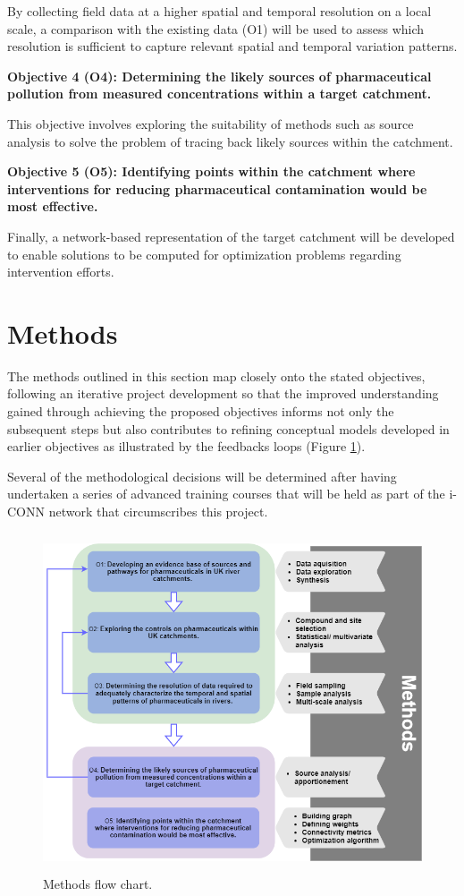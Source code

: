 \documentclass{article}
\begin{document}
By collecting field data at a higher spatial and temporal resolution on a local scale, a comparison with the existing data (O1) will be used to assess which resolution is sufficient to capture relevant spatial and temporal variation patterns.

\vspace{5mm}
\textbf{Objective 4 (O4): Determining the likely sources of pharmaceutical pollution from measured concentrations within a target catchment.}

This objective involves exploring the suitability of methods such as source analysis to solve the problem of tracing back likely sources within the catchment.

\vspace{5mm}
\textbf{Objective 5 (O5): Identifying points within the catchment where interventions for reducing pharmaceutical contamination would be most effective.}

Finally, a network-based representation of the target catchment will be developed to enable solutions to be  computed for optimization problems regarding intervention efforts.

\clearpage
\section{Methods}
The methods outlined in this section map closely onto the stated objectives, following an iterative project development so that the improved understanding gained through achieving the proposed objectives informs not only the subsequent steps but also contributes to refining conceptual models developed in earlier objectives as illustrated by the feedbacks loops (Figure \ref{fig_workflow}). 

Several of the methodological decisions will be determined after having undertaken a series of advanced training courses that will be held as part of the i-CONN network \citep{2021Iconn-ICONNNetwork} that circumscribes this project.

\begin{figure}[h]
    \centering
    \includegraphics[height=10cm]{fig_workflow.png}
    \caption{Methods flow chart.}
    \label{fig_workflow}
\end{figure}
\end{document}

